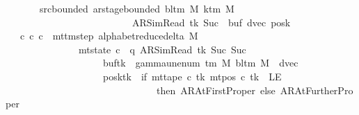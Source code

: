 \begin{isabellebody}
\ \ \ \ \ \ \ src{\isacharunderscore}{\kern0pt}bounded{\isacharcolon}{\kern0pt}\ {\isachardoublequoteopen}ar{\isacharunderscore}{\kern0pt}stage{\isacharunderscore}{\kern0pt}bounded\ {\isacharparenleft}{\kern0pt}bl{\isacharunderscore}{\kern0pt}tm\ M{\isacharparenright}{\kern0pt}\ {\isacharparenleft}{\kern0pt}k{\isacharunderscore}{\kern0pt}tm\ M{\isacharparenright}{\kern0pt}\isanewline
\ \ \ \ \ \ \ \ \ \ \ \ \ \ \ \ \ \ \ \ \ \ \ \ \ \ {\isacharparenleft}{\kern0pt}AR{\isacharunderscore}{\kern0pt}SimRead{\isacharcomma}{\kern0pt}\ tk{\isacharcomma}{\kern0pt}\ Suc\ {}{\isacharcomma}{\kern0pt}\ buf{\isacharcomma}{\kern0pt}\ dvec{\isacharcomma}{\kern0pt}\ posk{\isacharparenright}{\kern0pt}{\isachardoublequoteclose}\isanewline
\ \ \ {\isachardoublequoteopen}{\isasymexists}c{\isacharprime}{\kern0pt}{\isacharprime}{\kern0pt}{\isachardot}{\kern0pt}\ {\isacharparenleft}{\kern0pt}c{\isacharprime}{\kern0pt}{\isacharcomma}{\kern0pt}\ c{\isacharprime}{\kern0pt}{\isacharprime}{\kern0pt}{\isacharparenright}{\kern0pt}\ {\isasymin}\ mttm{\isacharunderscore}{\kern0pt}step\ {\isacharparenleft}{\kern0pt}alphabet{\isacharunderscore}{\kern0pt}reduce{\isacharunderscore}{\kern0pt}delta\ M{\isacharparenright}{\kern0pt}\isanewline
\ \ \ \ \ \ \ \ \ \ \ \ \ \ {\isasymand}\ mt{\isacharunderscore}{\kern0pt}state\ c{\isacharprime}{\kern0pt}{\isacharprime}{\kern0pt}\ {\isacharequal}{\kern0pt}\ {\isacharparenleft}{\kern0pt}q{\isacharcomma}{\kern0pt}\ AR{\isacharunderscore}{\kern0pt}SimRead{\isacharcomma}{\kern0pt}\ tk{\isacharcomma}{\kern0pt}\ Suc\ {\isacharparenleft}{\kern0pt}Suc\ {}{\isacharparenright}{\kern0pt}{\isacharcomma}{\kern0pt}\isanewline
\ \ \ \ \ \ \ \ \ \ \ \ \ \ \ \ \ \ \ \ buf{\isacharparenleft}{\kern0pt}tk\ {\isacharcolon}{\kern0pt}{\isacharequal}{\kern0pt}\ gamma{\isacharunderscore}{\kern0pt}unenum\ {\isacharparenleft}{\kern0pt}{\isasymGamma}{\isacharunderscore}{\kern0pt}tm\ M{\isacharparenright}{\kern0pt}\ {\isacharparenleft}{\kern0pt}bl{\isacharunderscore}{\kern0pt}tm\ M{\isacharparenright}{\kern0pt}\ {}{\isacharparenright}{\kern0pt}{\isacharcomma}{\kern0pt}\ dvec{\isacharcomma}{\kern0pt}\isanewline
\ \ \ \ \ \ \ \ \ \ \ \ \ \ \ \ \ \ \ \ posk{\isacharparenleft}{\kern0pt}tk\ {\isacharcolon}{\kern0pt}{\isacharequal}{\kern0pt}\ if\ mt{\isacharunderscore}{\kern0pt}tape\ c{\isacharprime}{\kern0pt}\ tk\ {\isacharparenleft}{\kern0pt}mt{\isacharunderscore}{\kern0pt}pos\ c{\isacharprime}{\kern0pt}\ tk{\isacharparenright}{\kern0pt}\ {\isacharequal}{\kern0pt}\ LE{}\isanewline
\ \ \ \ \ \ \ \ \ \ \ \ \ \ \ \ \ \ \ \ \ \ \ \ \ \ \ \ \ \ \ then\ AR{\isacharunderscore}{\kern0pt}AtFirstProper\ else\ AR{\isacharunderscore}{\kern0pt}AtFurtherProper{\isacharparenright}{\kern0pt}{\isacharparenright}{\kern0pt}\isanewline

\end{isabellebody}
